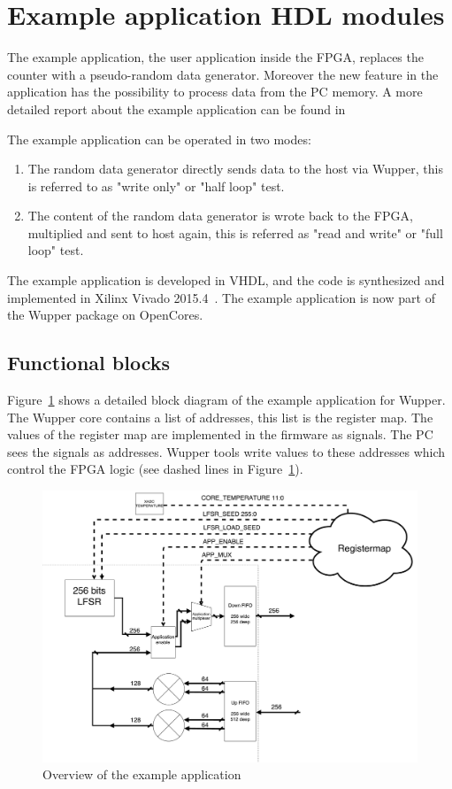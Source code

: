 \section{Example application HDL modules}
\label{sec:ExampleApp}
The example application, the user application inside the FPGA, replaces the counter with a pseudo-random data generator. Moreover the new feature in the application has the possibility to process data from the PC memory. A more detailed report about the example application can be found in \cite{ExampleApplication}

The example application can be operated in two modes:

\begin{enumerate}
	\item The random data generator directly sends data to the host via Wupper, this is referred to as "write only" or "half loop" test. 
	\item The content of the random data generator is wrote back to the FPGA, multiplied and sent to host again, this is referred as "read and write" or "full loop" test.  
	
\end{enumerate}

The example application is developed in VHDL, and the code is synthesized and implemented in Xilinx Vivado 2015.4~\cite{vivadoman}. The example application is now part of the Wupper package on OpenCores. 

\subsection {Functional blocks}

Figure~\ref{fig:benchmarkapp} shows a detailed block diagram of the example application for Wupper. The Wupper core contains a list of addresses, this list is the register map. The values of the register map are implemented in the firmware as signals. The PC sees the signals as addresses. Wupper tools write values to these addresses which control the FPGA logic (see dashed lines in Figure~\ref{fig:benchmarkapp}).

\begin{figure}[h]
	\centering
	\includegraphics[width = 0.8 \textwidth]{figures/benchmark_application.pdf}	
	\caption{Overview of the example application}
	\label{fig:benchmarkapp}
\end{figure}

